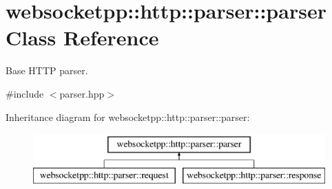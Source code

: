 \hypertarget{classwebsocketpp_1_1http_1_1parser_1_1parser}{}\section{websocketpp\+:\+:http\+:\+:parser\+:\+:parser Class Reference}
\label{classwebsocketpp_1_1http_1_1parser_1_1parser}


Base H\+T\+T\+P parser.  




{\ttfamily \#include $<$parser.\+hpp$>$}

Inheritance diagram for websocketpp\+:\+:http\+:\+:parser\+:\+:parser\+:\begin{figure}[H]
\begin{center}
\leavevmode
\includegraphics[height=2.000000cm]{classwebsocketpp_1_1http_1_1parser_1_1parser}
\end{center}
\end{figure}
